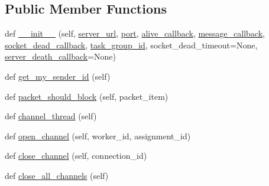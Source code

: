 \subsection*{Public Member Functions}
\begin{DoxyCompactItemize}
\item 
def \hyperlink{classparlai_1_1mturk_1_1core_1_1socket__manager_1_1SocketManager_ad366f39cbef4d0d8307cf350cd088ff9}{\+\_\+\+\_\+init\+\_\+\+\_\+} (self, \hyperlink{classparlai_1_1mturk_1_1core_1_1socket__manager_1_1SocketManager_abd4c4eb9e82e9b83858fb98882b0aa61}{server\+\_\+url}, \hyperlink{classparlai_1_1mturk_1_1core_1_1socket__manager_1_1SocketManager_a727a2f8cf4ec178505b0c3969dbfdbd9}{port}, \hyperlink{classparlai_1_1mturk_1_1core_1_1socket__manager_1_1SocketManager_a0e6c8fe0d13788925cab5301d0abbab0}{alive\+\_\+callback}, \hyperlink{classparlai_1_1mturk_1_1core_1_1socket__manager_1_1SocketManager_a109a500b9c4b30e5b20294cfb7890c28}{message\+\_\+callback}, \hyperlink{classparlai_1_1mturk_1_1core_1_1socket__manager_1_1SocketManager_ae081c99d290781a34bc5821b549c45f3}{socket\+\_\+dead\+\_\+callback}, \hyperlink{classparlai_1_1mturk_1_1core_1_1socket__manager_1_1SocketManager_a7fd872477871c32fb7b4f2f0c51f4e88}{task\+\_\+group\+\_\+id}, socket\+\_\+dead\+\_\+timeout=None, \hyperlink{classparlai_1_1mturk_1_1core_1_1socket__manager_1_1SocketManager_a13f30c6756085524cdde9706aedd2d2d}{server\+\_\+death\+\_\+callback}=None)
\item 
def \hyperlink{classparlai_1_1mturk_1_1core_1_1socket__manager_1_1SocketManager_a17a6ebab4a3c0e2882ba01398f2e9df1}{get\+\_\+my\+\_\+sender\+\_\+id} (self)
\item 
def \hyperlink{classparlai_1_1mturk_1_1core_1_1socket__manager_1_1SocketManager_a7b41199438da8694cc9c8d9b3e58da85}{packet\+\_\+should\+\_\+block} (self, packet\+\_\+item)
\item 
def \hyperlink{classparlai_1_1mturk_1_1core_1_1socket__manager_1_1SocketManager_a1518f69049fee8c6afb27120cdd6b1f3}{channel\+\_\+thread} (self)
\item 
def \hyperlink{classparlai_1_1mturk_1_1core_1_1socket__manager_1_1SocketManager_aa970567ac565617328cd1a07548b1427}{open\+\_\+channel} (self, worker\+\_\+id, assignment\+\_\+id)
\item 
def \hyperlink{classparlai_1_1mturk_1_1core_1_1socket__manager_1_1SocketManager_ae079bc95ebedcab4e52325253db490cf}{close\+\_\+channel} (self, connection\+\_\+id)
\item 
def \hyperlink{classparlai_1_1mturk_1_1core_1_1socket__manager_1_1SocketManager_a9a2c04d9512e6866dfda33397d8f363c}{close\+\_\+all\+\_\+channels} (self)

\end{DoxyCompactItemize}
